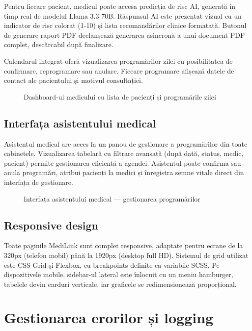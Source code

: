 Pentru fiecare pacient, medicul poate accesa predicția de risc AI, generată în timp real de modelul Llama 3.3 70B. Răspunsul AI este prezentat vizual cu un indicator de risc colorat (1-10) și lista recomandărilor clinice formatată. Butonul de generare raport PDF declanșează generarea asincronă a unui document PDF complet, descărcabil după finalizare.

Calendarul integrat oferă vizualizarea programărilor zilei cu posibilitatea de confirmare, reprogramare sau anulare. Fiecare programare afișează datele de contact ale pacientului și motivul consultației.

\begin{figure}[H]
  \centering
  \caption{Dashboard-ul medicului cu lista de pacienți și programările zilei}
  \label{fig:dashboard_doctor}
\end{figure}

\subsection{Interfața asistentului medical}

Asistentul medical are acces la un panou de gestionare a programărilor din toate cabinetele. Vizualizarea tabelară cu filtrare avansată (după dată, status, medic, pacient) permite gestionarea eficientă a agendei. Asistentul poate confirma sau anula programări, atribui pacienți la medici și înregistra semne vitale direct din interfața de gestionare.

\begin{figure}[H]
  \centering
  \caption{Interfața asistentului medical — gestionarea programărilor}
  \label{fig:dashboard_asistent}
\end{figure}

\subsection{Responsive design}

Toate paginile MediLink sunt complet responsive, adaptate pentru ecrane de la 320px (telefon mobil) până la 1920px (desktop full HD). Sistemul de grid utilizat este CSS Grid și Flexbox, cu breakpoints definite ca variabile SCSS. Pe dispozitivele mobile, sidebar-ul lateral este înlocuit cu un meniu hamburger, tabelele devin carduri verticale, iar graficele se redimensionează proporțional.

\section{Gestionarea erorilor și logging}

